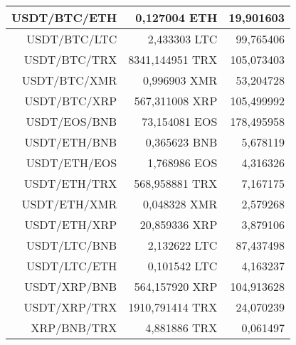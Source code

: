 \begin{table}
\begin{tabular}{|| r | r | r ||}
 \hline USDT/BTC/ETH & 0,127004 ETH & 19,901603\\ 
 \hline USDT/BTC/LTC & 2,433303 LTC & 99,765406\\ 
 \hline USDT/BTC/TRX & 8341,144951 TRX & 105,073403\\ 
 \hline USDT/BTC/XMR & 0,996903 XMR & 53,204728\\ 
 \hline USDT/BTC/XRP & 567,311008 XRP & 105,499992\\ 
 \hline USDT/EOS/BNB & 73,154081 EOS & 178,495958\\ 
 \hline USDT/ETH/BNB & 0,365623 BNB & 5,678119\\ 
 \hline USDT/ETH/EOS & 1,768986 EOS & 4,316326\\ 
 \hline USDT/ETH/TRX & 568,958881 TRX & 7,167175\\ 
 \hline USDT/ETH/XMR & 0,048328 XMR & 2,579268\\ 
 \hline USDT/ETH/XRP & 20,859336 XRP & 3,879106\\ 
 \hline USDT/LTC/BNB & 2,132622 LTC & 87,437498\\ 
 \hline USDT/LTC/ETH & 0,101542 LTC & 4,163237\\ 
 \hline USDT/XRP/BNB & 564,157920 XRP & 104,913628\\ 
 \hline USDT/XRP/TRX & 1910,791414 TRX & 24,070239\\ 
 \hline XRP/BNB/TRX & 4,881886 TRX & 0,061497\\ 
 \hline
\end{tabular}
\end{table}